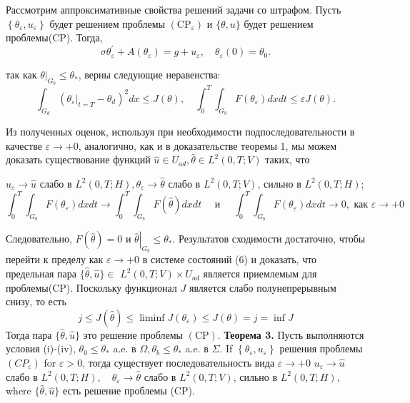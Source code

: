 Рассмотрим аппроксимативные свойства решений задачи со штрафом.
Пусть $\left\{\theta_{\varepsilon}, u_{\varepsilon}\right\}$ будет решением проблемы
$\left(\mathrm{CP}_{\varepsilon}\right)$ и $\{\theta, u\}$ будет решением проблемы(CP).
Тогда,
\[
    \sigma \theta_{\varepsilon}^{\prime}+A\left(\theta_{\varepsilon}\right)=g+u_{\varepsilon},
    \quad \theta_{\varepsilon}(0)=\theta_{0}.
\]

так как $\left.\theta\right|_{G_{b}} \leq \theta_{*}$, верны следующие неравенства:
\[
    \int_{G_{d}}\left(\left.\theta_{\varepsilon}\right|_{t=T}-\theta_{d}\right)^{2} d x \leq J(\theta),
    \quad \int_{0}^{T} \int_{G_{b}} F\left(\theta_{\varepsilon}\right) d x d t \leq \varepsilon J(\theta).
\]

Из полученных оценок, используя при необходимости подпоследовательности в качестве
$\varepsilon \rightarrow+0$, аналогично, как и в доказательстве теоремы 1, мы можем доказать существование функций
$\widehat{u} \in U_{a d}, \widehat{\theta} \in L^{2}(0, T ; V)$ таких, что

$u_{\varepsilon} \rightarrow \widehat{u}$ слабо в
$L^{2}(0, T ; H), \theta_{\varepsilon} \rightarrow \widehat{\theta}$ слабо в $L^{2}(0, T ; V)$,
сильно в $L^{2}(0, T ; H)$;
\[
    \int_{0}^{T} \int_{G_{b}} F\left(\theta_{\varepsilon}\right) d x d t \rightarrow \int_{0}^{T}
    \int_{G_{b}} F(\widehat{\theta}) dx dt \quad \text { и } \quad \int_{0}^{T} \int_{G_{b}}
    F\left(\theta_{\varepsilon}\right) dx dt \rightarrow 0, \text { как } \varepsilon \rightarrow+0
\]

Следовательно, $F(\widehat{\theta})=0$ и $\left.\widehat{\theta}\right|_{G_{b}} \leq \theta_{*}$.
Результатов сходимости достаточно, чтобы перейти к пределу как $\varepsilon \rightarrow+0$
в системе состояний (6) и доказать, что предельная пара
$\{\widehat{\theta}, \widehat{u}\} \in$ $L^{2}(0, T ; V) \times U_{a d}$
является приемлемым для проблемы(CP).
Поскольку функционал $J$ является слабо полунепрерывным снизу, то есть
\[
    j \leq J(\widehat{\theta}) \leq \liminf J\left(\theta_{\varepsilon}\right) \leq J(\theta)=j=\inf J
\]
Тогда пара $\{\widehat{\theta}, \widehat{u}\}$ это решение проблемы $(\mathrm{CP})$.
\textbf{Теорема 3.} Пусть выполняются условия (i)-(iv),
$\theta_{0} \leq \theta_{*}$ a.e. в $\Omega, \theta_{b} \leq \theta_{*}$ a.e. в
$\Sigma$. If $\left\{\theta_{\varepsilon}, u_{\varepsilon}\right\}$  решения проблемы
$\left(C P_{\varepsilon}\right)$ for $\varepsilon>0$, тогда существует последовательность вида
$\varepsilon \rightarrow+0$ $u_{\varepsilon} \rightarrow \widehat{u}$ слабо в
$L^{2}(0, T ; H), \quad \theta_{\varepsilon} \rightarrow \widehat{\theta}$ слабо в $L^{2}(0, T ; V)$,
сильно в $L^{2}(0, T ; H)$, where $\{\widehat{\theta}, \widehat{u}\}$ есть решение проблемы (CP).
